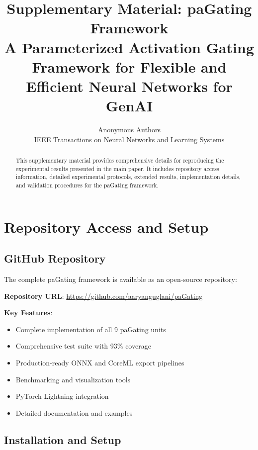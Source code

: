 \documentclass[journal]{IEEEtran}
\begin{document}
\title{Supplementary Material: paGating Framework\\
\large A Parameterized Activation Gating Framework for Flexible and Efficient Neural Networks for GenAI}

\author{Anonymous Authors\\
        IEEE Transactions on Neural Networks and Learning Systems}

\maketitle

\begin{abstract}
This supplementary material provides comprehensive details for reproducing the experimental results presented in the main paper. It includes repository access information, detailed experimental protocols, extended results, implementation details, and validation procedures for the paGating framework.
\end{abstract}

\section{Repository Access and Setup}

\subsection{GitHub Repository}
The complete paGating framework is available as an open-source repository:

\textbf{Repository URL}: \url{https://github.com/aaryanguglani/paGating}

\textbf{Key Features}:
\begin{itemize}
    \item Complete implementation of all 9 paGating units
    \item Comprehensive test suite with 93\% coverage
    \item Production-ready ONNX and CoreML export pipelines
    \item Benchmarking and visualization tools
    \item PyTorch Lightning integration
    \item Detailed documentation and examples
\end{itemize}

\subsection{Installation and Setup}
\end{document}
